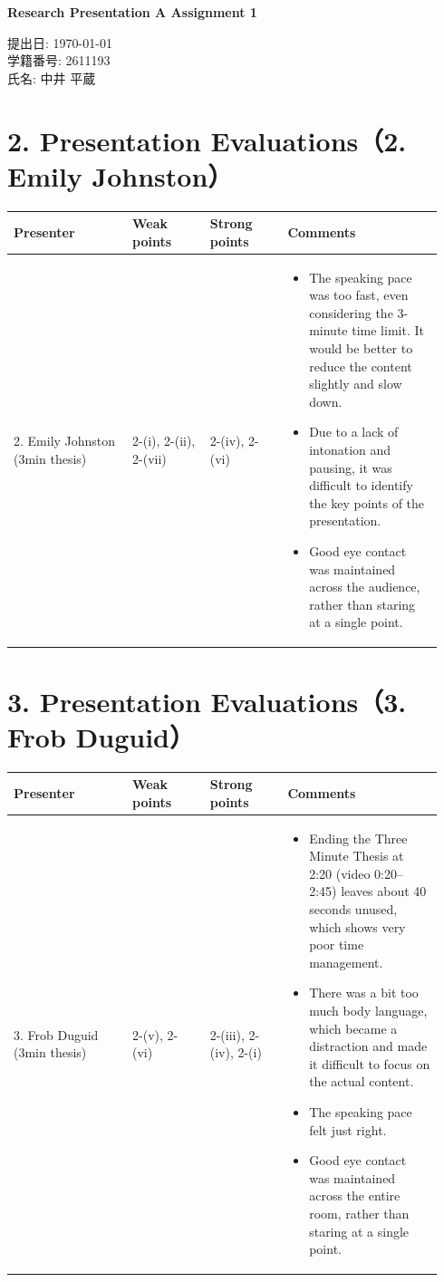 \documentclass[11pt,a4paper]{ltjsarticle}
\begin{document}
\begin{center}
{\LARGE \textbf{Research Presentation A Assignment 1}}
\end{center}
\vspace{1em}

\begin{flushright}
提出日: \today \\
学籍番号: 2611193 \\
氏名: 中井 平蔵
\end{flushright}

\section*{2. Presentation Evaluations（2. Emily Johnston）}
\begin{tabular}{|p{0.26\linewidth}|p{0.17\linewidth}|p{0.17\linewidth}|p{0.34\linewidth}|}
\hline
Presenter & Weak points & Strong points & Comments \\
\hline
2. Emily Johnston (3min thesis) & 2-(i), 2-(ii), 2-(vii) & 2-(iv), 2-(vi) &
\parbox[t]{\linewidth}{
\begin{itemize}
\item The speaking pace was too fast, even considering the 3-minute time limit. It would be better to reduce the content slightly and slow down.
\item Due to a lack of intonation and pausing, it was difficult to identify the key points of the presentation.
\item Good eye contact was maintained across the audience, rather than staring at a single point.
\end{itemize}
} \\
\hline
\end{tabular}

\vspace{1.5em}

\section*{3. Presentation Evaluations（3. Frob Duguid）}
\begin{tabular}{|p{0.26\linewidth}|p{0.17\linewidth}|p{0.17\linewidth}|p{0.34\linewidth}|}
\hline
Presenter & Weak points & Strong points & Comments \\
\hline
3. Frob Duguid (3min thesis) & 2-(v), 2-(vi) & 2-(iii), 2-(iv), 2-(i) &
\parbox[t]{\linewidth}{
\begin{itemize}
\item Ending the Three Minute Thesis at 2:20 (video 0:20--2:45) leaves about 40 seconds unused, which shows very poor time management.
\item There was a bit too much body language, which became a distraction and made it difficult to focus on the actual content.
\item The speaking pace felt just right.
\item Good eye contact was maintained across the entire room, rather than staring at a single point.
\end{itemize}
} \\
\hline
\end{tabular}
\end{document}
